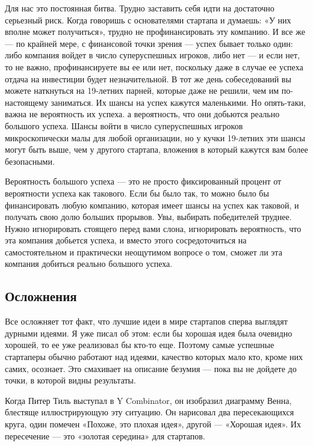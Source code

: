 \documentclass[ebook,12pt,oneside,openany]{memoir}
\begin{document}
Для нас это постоянная битва. Трудно заставить себя идти на достаточно
серьезный риск. Когда говоришь с основателями стартапа и думаешь: «У
них вполне может получиться», трудно не профинансировать эту компанию.
И все же — по крайней мере, с финансовой точки зрения — успех бывает
только один: либо компания войдет в число суперуспешных игроков, либо
нет — и если нет, то не важно, профинансируете вы ее или нет,
поскольку даже в случае ее успеха отдача на инвестиции будет
незначительной. В тот же день собеседований вы можете наткнуться на
19-летних парней, которые даже не решили, чем им по-настоящему
заниматься. Их шансы на успех кажутся маленькими. Но опять-таки, важна
не вероятность их успеха. а вероятность, что они добьются реально
большого успеха. Шансы войти в число суперуспешных игроков
микроскопически малы для любой организации, но у кучки 19-летних эти
шансы могут быть выше, чем у другого стартапа, вложения в который
кажутся вам более безопасными. \newline

Вероятность большого успеха — это не просто фиксированный процент от
вероятности успеха как такового. Если бы было так, то можно было бы
финансировать любую компанию, которая имеет шансы на успех как
таковой, и получать свою долю больших прорывов. Увы, выбирать
победителей труднее. Нужно игнорировать стоящего перед вами слона,
игнорировать вероятность, что эта компания добьется успеха, и вместо
этого сосредоточиться на самостоятельном и практически неощутимом
вопросе о том, сможет ли эта компания добиться реально большого
успеха. \newline

\subsection{Осложнения}

Все осложняет тот факт, что лучшие идеи в мире стартапов сперва
выглядят дурными идеями. Я уже писал об этом: если бы хорошая идея
была очевидно хорошей, то ее уже реализовал бы кто-то еще. Поэтому
самые успешные стартаперы обычно работают над идеями, качество которых
мало кто, кроме них самих, осознает. Это смахивает на описание безумия
— пока вы не дойдете до точки, в которой видны результаты. \newline

Когда Питер Тиль выступал в Y Combinator, он изобразил диаграмму
Венна, блестяще иллюстрирующую эту ситуацию. Он нарисовал два
пересекающихся круга, один помечен «Похоже, это плохая идея», другой —
«Хорошая идея». Их пересечение — это «золотая середина» для стартапов. \newline
\end{document}
